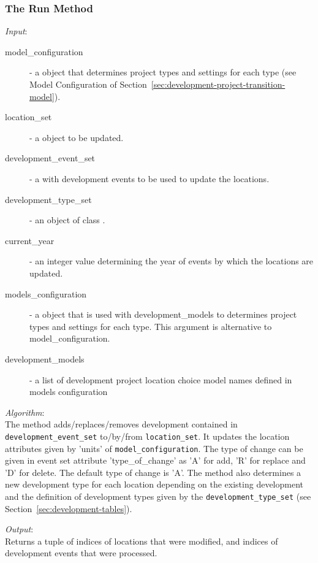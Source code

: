 \subsubsection{The Run Method}
%
{\it Input}:
\begin{description}
\item[model_configuration] - a  object that determines
  project types and settings for each type (see Model Configuration of
  Section~\ref{sec:development-project-transition-model}).
\item[location_set] - a  object to be updated.
\item[development_event_set] - a  with development
  events to be used to update the locations.
\item[development_type_set] - an object of class .
\item[current_year] - an integer value determining the year of events by
  which the locations are updated.
\item[models_configuration] - a  object
  that is used with development_models to determines project
  types and settings for each type.  This argument is
  alternative to model_configuration.
\item[development_models] - a list of development project
  location choice model names defined in models
  configuration
\end{description}

{\it Algorithm}:\\[1mm]
The method adds/replaces/removes development contained in \verb|development_event_set| 
to/by/from \verb|location_set|. It updates the location attributes
given by 'units' of \verb|model_configuration|. The type of change can be given 
in event set attribute 'type_of_change' as 'A' for add, 'R' for replace and 'D' for delete.
The default type of change is 'A'. The method also determines a new development type 
for each location depending on the existing development and the definition of development types 
given by the \verb|development_type_set| (see Section~\ref{sec:development-tables}). 
 

{\it Output}:~\\[1mm]
Returns a tuple of indices of locations that were modified, and indices of
development events that were processed.

